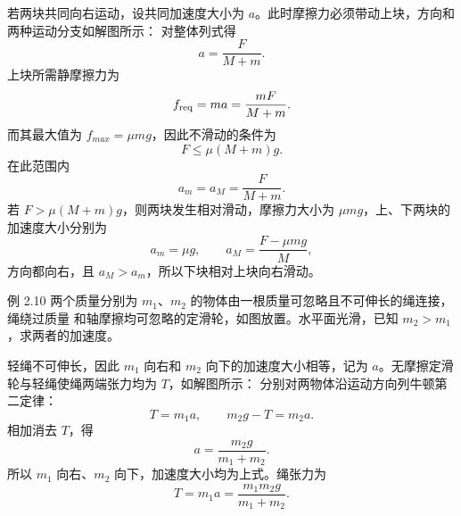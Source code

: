\begin{xesolution}
若两块共同向右运动，设共同加速度大小为 $a$。此时摩擦力必须带动上块，方向和两种运动分支如解图所示：
\soldiagTwoNine
对整体列式得
\[
  a=\frac{F}{M+m}.
\]
上块所需静摩擦力为
\[
  f_{\rm req}=ma=\frac{mF}{M+m}.
\]
而其最大值为 $f_{max}=\mu mg$，因此不滑动的条件为
\[
  \boxed{F\le\mu(M+m)g}.
\]
在此范围内
\[
  \boxed{a_m=a_M=\frac{F}{M+m}}.
\]
若 $F>\mu(M+m)g$，则两块发生相对滑动，摩擦力大小为 $\mu mg$，上、下两块的加速度大小分别为
\[
  \boxed{a_m=\mu g},
  \qquad
  \boxed{a_M=\frac{F-\mu mg}{M}},
\]
方向都向右，且 $a_M>a_m$，所以下块相对上块向右滑动。
\end{xesolution}

\begin{origexamplebox}{例 2.10}
两个质量分别为 $m_1$、$m_2$ 的物体由一根质量可忽略且不可伸长的绳连接，绳绕过质量
和轴摩擦均可忽略的定滑轮，如图放置。水平面光滑，已知 $m_2>m_1$，求两者的加速度。

\begin{center}\begin{minipage}{\linewidth}\centering
{}
\end{minipage}\end{center}
\end{origexamplebox}

\begin{xesolution}
轻绳不可伸长，因此 $m_1$ 向右和 $m_2$ 向下的加速度大小相等，记为 $a$。无摩擦定滑轮与轻绳使绳两端张力均为 $T$，如解图所示：
\soldiagTwoTen
分别对两物体沿运动方向列牛顿第二定律：
\[
  T=m_1a,
  \qquad
  m_2g-T=m_2a.
\]
相加消去 $T$，得
\[
  \boxed{a=\frac{m_2g}{m_1+m_2}}.
\]
所以 $m_1$ 向右、$m_2$ 向下，加速度大小均为上式。绳张力为
\[
  T=m_1a=\frac{m_1m_2g}{m_1+m_2}.
\]
\end{xesolution}
